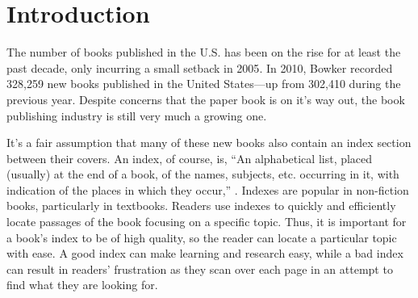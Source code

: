 \section{Introduction}

The number of books published in the U.S. has been on the rise for at least the past decade, only incurring a small setback in 2005\cite{bowker}.
In 2010, Bowker recorded 328,259 new books published in the United States---up from 302,410 during the previous year.
Despite concerns that the paper book is on it's way out, the book publishing industry is still very much a growing one.

\begin{center}
\end{center}

It's a fair assumption that many of these new books also contain an index section between their covers.
An index, of course, is, ``An alphabetical list, placed (usually) at the end of a book, of the names, subjects, etc. occurring in it, with indication of the places in which they occur,'' \cite{oed-index}.
Indexes are popular in non-fiction books, particularly in textbooks.
Readers use indexes to quickly and efficiently locate passages of the book focusing on a specific topic.
Thus, it is important for a book's index to be of high quality, so the reader can locate a particular topic with ease.
A good index can make learning and research easy, while a bad index can result in readers' frustration as they scan over each page in an attempt to find what they are looking for.

